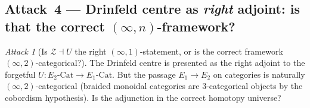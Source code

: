 \documentclass[11pt]{article}
\theoremstyle{definition}
\theoremstyle{remark}
\newtheorem{attack}[thm]{Attack}
\newcommand{\cZ}{\mathcal{Z}}
\newcommand{\Eone}{E_1}
\newcommand{\Etwo}{E_2}
\begin{document}
\subsection*{Attack~4 --- Drinfeld centre as \emph{right} adjoint:
is that the correct $(\infty,n)$-framework?}

\begin{attack}[Is $\cZ \dashv U$ the right $(\infty,1)$-statement, or
is the correct framework $(\infty, 2)$-categorical?]
\label{att:drinfeld-adjoint}
The Drinfeld centre is presented as the right adjoint to the
forgetful $U\colon \Etwo\text{-Cat} \to \Eone\text{-Cat}$. But
the passage $\Eone \to \Etwo$ on categories is naturally
$(\infty, 2)$-categorical (braided monoidal categories are
$3$-categorical objects by the cobordism hypothesis). Is the
adjunction in the correct homotopy universe?
\end{attack}
\end{document}
